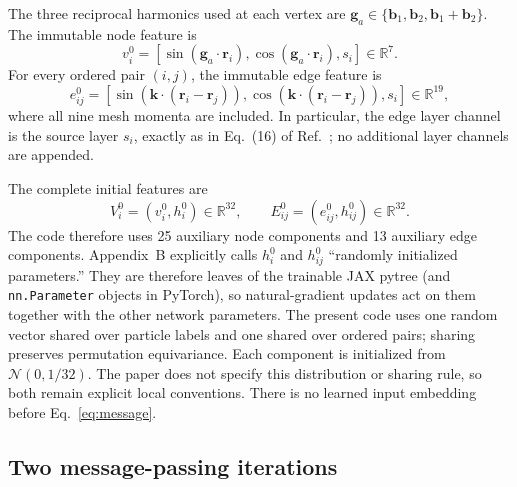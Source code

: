 The three reciprocal harmonics used at each vertex are
$\bm g_a\in\{\bm b_1,\bm b_2,\bm b_1+\bm b_2\}$. The immutable node
feature is
\begin{equation}
 v_i^0=\left[
 \sin(\bm g_a\!\cdot\!\bm r_i),
 \cos(\bm g_a\!\cdot\!\bm r_i),s_i
 \right]\in\mathbb R^7 .
 \label{eq:nodefeature}
\end{equation}
For every ordered pair $(i,j)$, the immutable edge feature is
\begin{equation}
 e_{ij}^0=\left[
 \sin\!\left(\bm k\!\cdot\!(\bm r_i-\bm r_j)\right),
 \cos\!\left(\bm k\!\cdot\!(\bm r_i-\bm r_j)\right),s_i
 \right]\in\mathbb R^{19},
 \label{eq:edgefeature}
\end{equation}
where all nine mesh momenta are included. In particular, the edge layer
channel is the source layer $s_i$, exactly as in Eq.~(16) of
Ref.~\cite{luo}; no additional layer channels are appended.

The complete initial features are
\begin{equation}
 V_i^0=(v_i^0,h_i^0)\in\mathbb R^{32},\qquad
 E_{ij}^0=(e_{ij}^0,h_{ij}^0)\in\mathbb R^{32}.
\end{equation}
The code therefore uses 25 auxiliary node components and 13 auxiliary edge
components. Appendix~B explicitly calls $h_i^0$ and $h_{ij}^0$ ``randomly
initialized parameters.'' They are therefore leaves of the trainable JAX
pytree (and \texttt{nn.Parameter} objects in PyTorch), so natural-gradient
updates act on them together with the other network parameters. The present
code uses one random vector shared over particle labels and one shared over
ordered pairs; sharing preserves permutation equivariance. Each component is
initialized from $\mathcal N(0,1/32)$. The paper does not specify this
distribution or sharing rule, so both remain explicit local conventions.
There is no learned input embedding before Eq.~\eqref{eq:message}.

\subsection{Two message-passing iterations}

